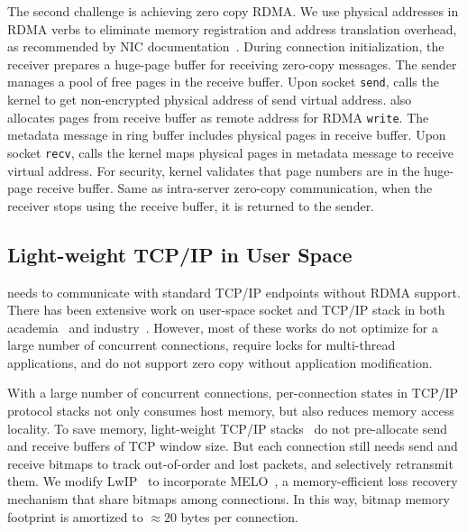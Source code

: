 The second challenge is achieving zero copy RDMA. We use physical addresses in RDMA verbs to eliminate memory registration and address translation overhead, as recommended by NIC documentation~\cite{mellanox}. During connection initialization, the receiver prepares a huge-page buffer for receiving zero-copy messages. The sender manages a pool of free pages in the receive buffer. Upon socket \texttt{send}, \libipc calls the kernel to get non-encrypted physical address of send virtual address. \libipc also allocates pages from receive buffer as remote address for RDMA \texttt{write}. The metadata message in ring buffer includes physical pages in receive buffer. Upon socket \texttt{recv}, \libipc calls the kernel maps physical pages in metadata message to receive virtual address. For security, kernel validates that page numbers are in the huge-page receive buffer. Same as intra-server zero-copy communication, when the receiver stops using the receive buffer, it is returned to the sender.


\subsection{Light-weight TCP/IP in User Space}
\label{subsec:lwip}

\sys{} needs to communicate with standard TCP/IP endpoints without RDMA support. There has been extensive work on user-space socket and TCP/IP stack in both academia~\cite{dunkels2001design,rizzo2012netmap,huang2017high} and industry~\cite{libvma,openonload,dbl}. However, most of these works do not optimize for a large number of concurrent connections, require locks for multi-thread applications, and do not support zero copy without application modification.


With a large number of concurrent connections, per-connection states in TCP/IP protocol stacks not only consumes host memory, but also reduces memory access locality. To save memory, light-weight TCP/IP stacks~\cite{dunkels2001design} do not pre-allocate send and receive buffers of TCP window size. But each connection still needs send and receive bitmaps to track out-of-order and lost packets, and selectively retransmit them. We modify LwIP~\cite{dunkels2001design} to incorporate MELO~\cite{lu2017memory}, a memory-efficient loss recovery mechanism that share bitmaps among connections. In this way, bitmap memory footprint is amortized to $\approx20$ bytes per connection.

